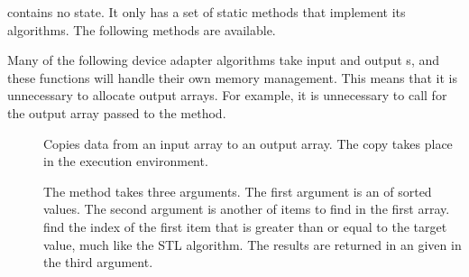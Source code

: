 contains no state. It only has a
set of static methods that implement its algorithms. The following methods
are available.

\begin{didyouknow}
  Many of the following device adapter algorithms take input and output
  s, and these functions will handle their own
  memory management. This means that it is unnecessary to allocate output
  arrays.  For example, it is unnecessary to call
   for the output array
  passed to the  method.
\end{didyouknow}

\begin{description}
\item[]  Copies data from an input array to an
  output array. The copy takes place in the execution environment.
\item[]  The
   method takes three arguments. The first argument
  is an  of sorted values. The second argument
  is another  of items to find in the first
  array.  find the index of the first item that is
  greater than or equal to the target value, much like the
   STL algorithm. The results are returned in
  an  given in the third argument.


\end{description}
